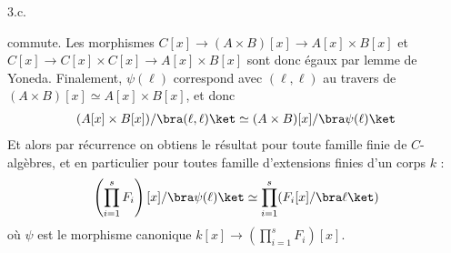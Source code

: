 \documentclass[11pt]{article}
\begin{document}
\begin{question}{3.c.}
\begin{figure}[H]
        \end{figure}
        commute. Les morphismes $C[x] \to (A \times B)[x] \to A[x] \times B[x]$ et $C[x] \to C[x] \times C[x] \to A[x] \times B[x]$ sont donc égaux par lemme de Yoneda. Finalement, $\psi(\ell)$ correspond avec $(\ell,\ell)$ au travers de $(A \times B)[x] \simeq A[x] \times B[x]$, et donc
        \begin{align*}
            (A[x] \times B[x])/\bra (\ell, \ell) \ket \simeq (A \times B)[x]/\bra \psi(\ell) \ket
        \end{align*}
        Et alors par récurrence on obtiens le résultat pour toute famille finie de $C$-algèbres, et en particulier pour toutes famille d'extensions finies d'un corps $k$ :
        \begin{align*}
            \left( \prod_{i = 1}^s F_i \right)[x]/\bra \psi(\ell) \ket \simeq \prod_{i = 1}^s (F_i[x]/\bra \ell \ket)
        \end{align*}
        où $\psi$ est le morphisme canonique $k[x] \to \left(\prod_{i = 1}^s F_i\right)[x]$.
    \end{question}
\end{document}
